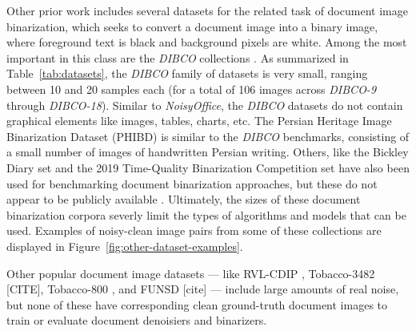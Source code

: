 \documentclass[runningheads]{llncs}
\begin{document}
Other prior work includes several datasets for the related task of document image binarization, which seeks to convert a document image into a binary image, where foreground text is black and background pixels are white.
Among the most important in this class are the \emph{DIBCO} collections \cite{dibco-09,dibco-10,dibco-11,dibco-12,dibco-13,dibco-14,dibco-16,dibco-17,dibco-18}.
As summarized in Table~\ref{tab:datasets}, the \emph{DIBCO} family of datasets is very small, ranging between 10 and 20 samples each (for a total of 106 images across \emph{DIBCO-9} through \emph{DIBCO-18}).
Similar to \emph{NoisyOffice}, the \emph{DIBCO} datasets do not contain graphical elements like images, tables, charts, etc.
The Persian Heritage Image Binarization Dataset (PHIBD) \cite{phibc-2012-nafchi,nafchi-2013-icdar} is similar to the \emph{DIBCO} benchmarks, consisting of a small number of images of handwritten Persian writing.
Others, like the Bickley Diary set \cite{bickley-diary} and the 2019 Time-Quality Binarization Competition set \cite{2019-time-quality-competition} have also been used for benchmarking document binarization approaches, but these do not appear to be publicly available \cite{tensmeyer-binarization-review-2020}.
Ultimately, the sizes of these document binarization corpora severly limit the types of algorithms and models that can be used.
Examples of noisy-clean image pairs from some of these collections are displayed in Figure~\ref{fig:other-dataset-examples}.

Other popular document image datasets --- like RVL-CDIP \cite{ref_RVL-CDIP}, Tobacco-3482 [CITE], Tobacco-800 \cite{ref_Tobacco800}, and FUNSD [cite] --- include large amounts of real noise, but none of these have corresponding clean ground-truth document images to train or evaluate document denoisiers and binarizers.
\end{document}
